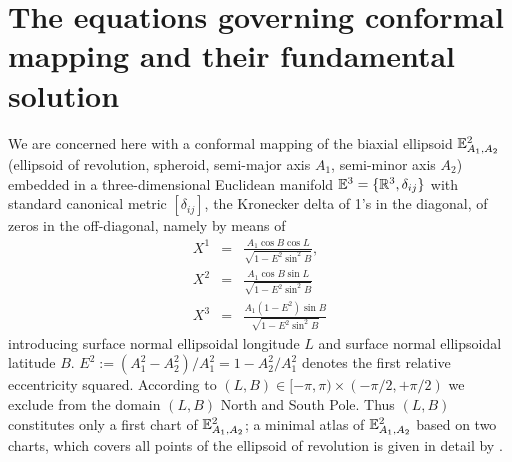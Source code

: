 \documentclass[jog]{svjour}
\begin{document}

\section{The equations governing conformal mapping and their fundamental
solution}
\label{sec:2}

We are concerned here with a conformal mapping of the biaxial ellipsoid
$\Bbb{E}^2_{A_1,A_2}$ (ellipsoid of revolution, spheroid, semi-major
axis $A_1$, semi-minor axis $A_2$) embedded in a three-dimensional
Euclidean manifold $\Bbb{E}^3=\{\Bbb{R}^3,\delta_{ij}\}$ with standard
canonical metric $[\delta_{ij}]$, the Kronecker delta of 1's in the
diagonal, of zeros in the off-diagonal, namely by means of
\begin{eqnarray}
X^1 &= &\frac{A_1\cos B \cos L}{\sqrt{1-E^2\sin^2B}}, \nonumber \\
X^2 &= &\frac{A_1\cos B \sin L}{\sqrt{1-E^2\sin^2B}} \\
X^3 &= &\frac{A_1(1-E^2) \sin B}{\sqrt{1-E^2\sin^2B}} \nonumber
\label{eq:1}
\end{eqnarray}
introducing surface normal ellipsoidal longitude $L$ and surface normal
ellipsoidal latitude $B$. $E^2:=(A^2_1-A^2_2)/A^2_1=1-A^2_2/A^2_1$
denotes the first relative eccentricity squared. According to $(L,B) \in
[-\pi,\pi) \times (-\pi/2,+\pi/2)$ we exclude from the domain $(L,B)$
North and South Pole. Thus $(L,B)$ constitutes only a first chart of
$\Bbb{E}^2_{A_1,A_2}$; a minimal atlas of $\Bbb{E}^2_{A_1,A_2}$ based
on two charts, which covers all points of the ellipsoid of revolution is
given in detail by \citet{graf95b}.
\end{document}
